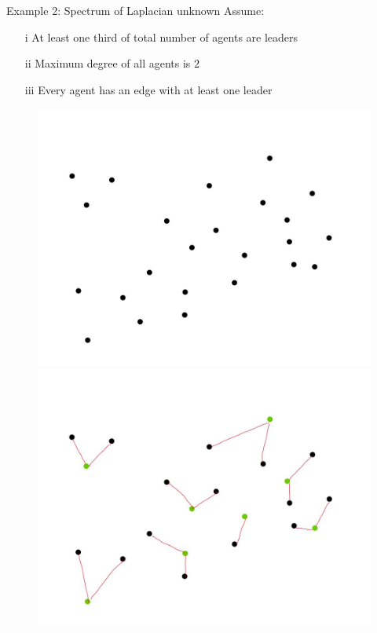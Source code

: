 \documentclass{beamer}
\begin{document}
\begin{frame}{Example 2: Spectrum of Laplacian unknown}
Assume:
\begin{itemize}
	\item[i] At least one third of total number of agents are leaders
	\item[ii] Maximum degree of all agents is $2$				
	\item[iii] Every agent has an edge with at least one leader
\end{itemize}
\begin{figure}[]	
	\centering
		\begin{overprint}
			\includegraphics[scale=0.65]{figures/graph_nodes_0.jpg}	
			\onslide<2>\includegraphics[scale=0.65]{figures/graph_minimal_1.jpg}	

\end{overprint}
\end{figure}
\end{frame}
\end{document}
